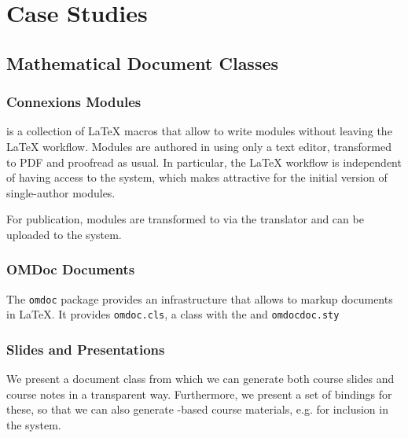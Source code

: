 \section{Case Studies}
\subsection{Mathematical Document Classes}

\subsubsection{Connexions Modules}

{\cnxlatex} is a collection of {\LaTeX} macros that allow to write {\connexions} modules
without leaving the {\LaTeX} workflow. Modules are authored in {\cnxlatex} using only a
text editor, transformed to PDF and proofread as usual. In particular, the {\LaTeX}
workflow is independent of having access to the {\connexions} system, which makes
{\cnxlatex} attractive for the initial version of single-author modules.


For publication, {\cnxlatex} modules are transformed to {\cnxml} via the {\latexml}
translator and can be uploaded to the {\connexions} system.

\subsubsection{OMDoc Documents}

The \verb|omdoc| package provides an infrastructure that allows to markup {\omdoc}
documents in {\LaTeX}. It provides \verb|omdoc.cls|, a class with the and \verb|omdocdoc.sty|

\subsubsection{Slides and Presentations}

We present a document class from which we can generate both course slides and course
notes in a transparent way. Furthermore, we present a set of {\latexml} bindings for
these, so that we can also generate {\omdoc}-based course materials, e.g. for
inclusion in the {\activemath} system.



